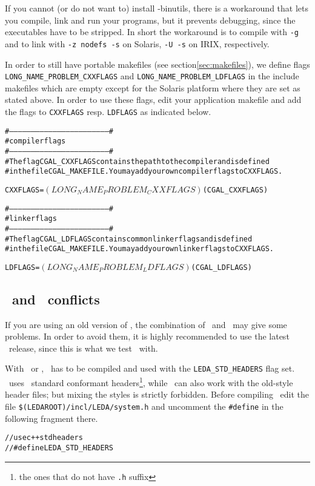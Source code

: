 If you cannot (or do not want to) install \gnu -binutils, there is a
workaround that lets you compile, link and run your programs, but it
prevents debugging, since the executables have to be stripped. In
short the workaround is to compile with \texttt{-g} and to link with
\texttt{-z nodefs -s} on Solaris, \texttt{-U -s} on IRIX,
respectively.

In order to still have portable makefiles (see
section\ref{sec:makefiles}), we define flags
\texttt{LONG\_NAME\_PROBLEM\_CXXFLAGS} and
\texttt{LONG\_NAME\_PROBLEM\_LDFLAGS} in the include makefiles which
are empty except for the Solaris platform where they are set as stated
above. In order to use these flags, edit your application makefile and
add the flags to \texttt{CXXFLAGS} resp. \texttt{LDFLAGS} as indicated
below.
\begin{alltt}
#---------------------------------------------------------------------#
#                    compiler flags
#---------------------------------------------------------------------#
# The flag CGAL_CXXFLAGS contains the path to the compiler and is defined
# in the file CGAL_MAKEFILE. You may add your own compiler flags to CXXFLAGS.

CXXFLAGS = $(LONG_NAME_PROBLEM_CXXFLAGS) $(CGAL_CXXFLAGS) 

#---------------------------------------------------------------------#
#                    linker flags
#---------------------------------------------------------------------#
# The flag CGAL_LDFLAGS contains common linker flags and is defined
# in the file CGAL_MAKEFILE. You may add your own linker flags to CXXFLAGS.

LDFLAGS = $(LONG_NAME_PROBLEM_LDFLAGS) $(CGAL_LDFLAGS) 
\end{alltt}

\subsection{\leda\ and \stl\ conflicts}\label{subs:ledastlconfl}

If you are using an old version of \leda, the combination of \leda\ 
and \stl\ may give some problems. In order to avoid them, it is highly
recommended to use the latest \leda\ release, since this is what we
test \cgal\ with.

With \msvc\ or \bcc, \leda\ has to be compiled and used with the
\texttt{LEDA\_STD\_HEADERS} flag set. \cgal\ uses \CC\ standard
conformant headers\footnote{the ones that do not have \texttt{.h}
  suffix}, while \leda\ can also work with the old-style header files;
but mixing the styles is strictly forbidden. Before compiling \leda\,
edit the file \texttt{\$(LEDAROOT)/incl/LEDA/system.h} and uncomment
the \texttt{\#define} in the following fragment there.
\begin{alltt}
// use c++ std headers
//#define LEDA_STD_HEADERS
\end{alltt}

